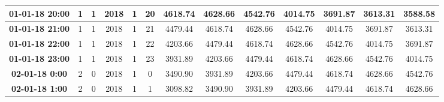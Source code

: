 \begin{table}[ht!]
{\begin{tabular}{|c|c|c|c|c|c|c|c|c|c|c|c|c|}
\textbf{01-01-18 20:00} & 1                & 1                & 2018          & 1              & 20            & 4618.74     & 4628.66           & 4542.76           & 4014.75           & 3691.87           & 3613.31           & 3588.58           \\ \hline
\textbf{01-01-18 21:00} & 1                & 1                & 2018          & 1              & 21            & 4479.44     & 4618.74           & 4628.66           & 4542.76           & 4014.75           & 3691.87           & 3613.31           \\ \hline
\textbf{01-01-18 22:00} & 1                & 1                & 2018          & 1              & 22            & 4203.66     & 4479.44           & 4618.74           & 4628.66           & 4542.76           & 4014.75           & 3691.87           \\ \hline
\textbf{01-01-18 23:00} & 1                & 1                & 2018          & 1              & 23            & 3931.89     & 4203.66           & 4479.44           & 4618.74           & 4628.66           & 4542.76           & 4014.75           \\ \hline
\textbf{02-01-18 0:00}  & 2                & 0                & 2018          & 1              & 0             & 3490.90     & 3931.89           & 4203.66           & 4479.44           & 4618.74           & 4628.66           & 4542.76           \\ \hline
\textbf{02-01-18 1:00}  & 2                & 0                & 2018          & 1              & 1             & 3098.82     & 3490.90           & 3931.89           & 4203.66           & 4479.44           & 4618.74           & 4628.66           \\ \hline
\end{tabular}}
\end{table}



